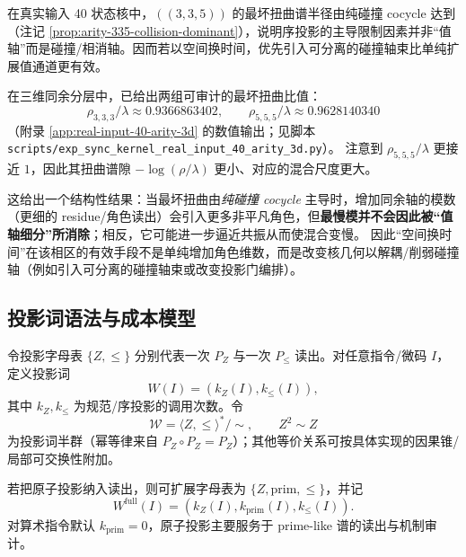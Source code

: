 \begin{remark}\label{rem:pom-collision-axis}
在真实输入 40 状态核中，\(((3,3,5))\) 的最坏扭曲谱半径由纯碰撞 cocycle 达到（注记 \ref{prop:arity-335-collision-dominant}），说明序投影的主导限制因素并非“值轴”而是碰撞/相消轴。因而若以空间换时间，优先引入可分离的碰撞轴束比单纯扩展值通道更有效。
\end{remark}

\begin{remark}\label{rem:pom-more-axis-slower}
在三维同余分层中，已给出两组可审计的最坏扭曲比值：
\[
\rho_{3,3,3}/\lambda\approx 0.9366863402,
\qquad
\rho_{5,5,5}/\lambda\approx 0.9628140340
\]
（附录 \ref{app:real-input-40-arity-3d} 的数值输出；见脚本 \texttt{scripts/exp\_sync\_kernel\_real\_input\_40\_arity\_3d.py}）。
注意到 \(\rho_{5,5,5}/\lambda\) 更接近 \(1\)，因此其扭曲谱隙 \(-\log(\rho/\lambda)\) 更小、对应的混合尺度更大。

这给出一个结构性结果：当最坏扭曲由\emph{纯碰撞 cocycle} 主导时，增加同余轴的模数（更细的 residue/角色读出）会引入更多非平凡角色，但\textbf{最慢模并不会因此被“值轴细分”所消除}；相反，它可能进一步逼近共振从而使混合变慢。
因此“空间换时间”在该相区的有效手段不是单纯增加角色维数，而是改变核几何以解耦/削弱碰撞轴（例如引入可分离的碰撞轴束或改变投影门编排）。
\end{remark}

\subsection{投影词语法与成本模型}\label{subsec:pom-words}
\begin{definition}[投影词与半群]\label{def:pom-projection-word}
令投影字母表 $\{Z,\le\}$ 分别代表一次 $P_Z$ 与一次 $P_{\le}$ 读出。对任意指令/微码 $I$，定义投影词
\[
W(I)=(k_Z(I),k_{\le}(I)),
\]
其中 $k_Z,k_{\le}$ 为规范/序投影的调用次数。令
\[
\mathcal{W}=\langle Z,\le\rangle^*/\sim,\qquad Z^2\sim Z
\]
为投影词半群（幂等律来自 $P_Z\circ P_Z=P_Z$）；其他等价关系可按具体实现的因果锥/局部可交换性附加。
\end{definition}

\begin{remark}[原子投影的扩展投影词]\label{rem:pom-word-prim}
若把原子投影纳入读出，则可扩展字母表为 $\{Z,\mathrm{prim},\le\}$，并记
\[
W^{\mathrm{full}}(I)=(k_Z(I),k_{\mathrm{prim}}(I),k_{\le}(I)).
\]
对算术指令默认 $k_{\mathrm{prim}}=0$，原子投影主要服务于 prime-like 谱的读出与机制审计。
\end{remark}

